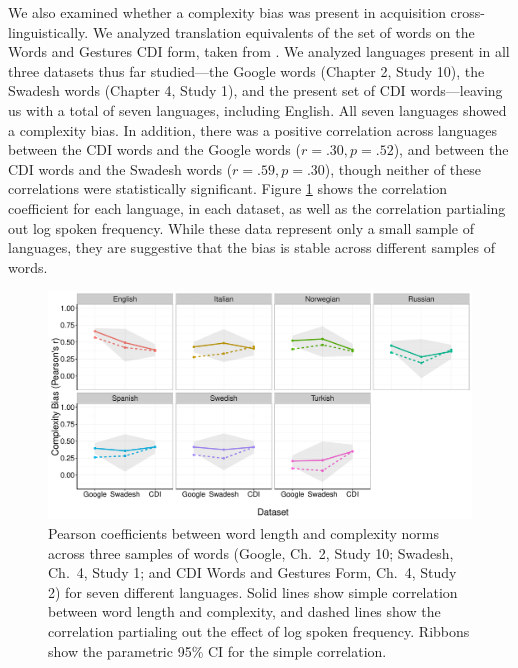 We also examined whether a complexity bias was present in acquisition cross-linguistically. We analyzed translation equivalents of the set of words on the Words and Gestures CDI form, taken from . We analyzed  languages present in all three datasets thus far studied---the Google words (Chapter 2, Study 10), the Swadesh words (Chapter 4, Study 1), and the present set of CDI words---leaving us with a total of seven languages, including English. All seven languages showed a complexity bias. In addition, there was a positive correlation across languages between the CDI words and the Google words ($r = .30, p = .52$), and between the CDI words and the Swadesh words ($r = .59, p = .30$), though neither of these correlations were statistically significant. Figure \ref{fig:synthesis4} shows the correlation coefficient for each language, in each dataset, as well as the correlation partialing out log spoken frequency. While these data represent only a small sample of languages, they are suggestive that the bias is stable across different samples of words.

\begin{figure}[t!]
\begin{center}
\includegraphics[scale = .47]{figs/chap4_synthesis2.pdf}
\end{center}
\caption{Pearson coefficients between word length and complexity norms across three samples of words (Google, Ch.\ 2, Study 10; Swadesh, Ch.\ 4, Study 1; and CDI Words and Gestures Form, Ch.\ 4, Study 2) for seven different languages. Solid lines show simple correlation between word length and complexity, and dashed lines show the correlation partialing out the effect of log spoken frequency. Ribbons show the parametric 95\% CI for the simple correlation. }
\label{fig:synthesis4}
\end{figure}




